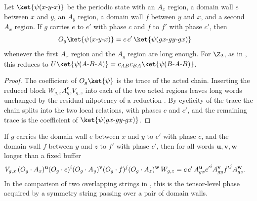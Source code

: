 \begin{lemma}
    \label{thm:mpug_domain_wall_state}
    \leanok
    Let $\ket{\psi(x\text{-}y\text{-}x)}$ be the periodic state with an $A_x$
    region, a domain wall $e$ between $x$ and $y$, an $A_y$ region, a domain
    wall $f$ between $y$ and $x$, and a second $A_x$ region. If $g$ carries
    $e$ to $e'$ with phase $c$ and $f$ to $f'$ with phase $c'$, then
    \begin{align}
        O_g\ket{\psi(x\text{-}y\text{-}x)}
         & =c\,c'\,\ket{\psi(gx\text{-}gy\text{-}gx)}
        \notag
    \end{align}
    whenever the first $A_x$ region and the $A_y$ region are long enough.
    For $\Z_2$, as in \cite[Section~III.B]{GarreRubioSchuch2024DomainWall},
    this reduces to $U\ket{\psi(A\text{-}B\text{-}A)}
        =c_{AB}c_{BA}\ket{\psi(B\text{-}A\text{-}B)}$.
\end{lemma}

\begin{proof}\leanok
    The coefficient of $O_g\ket{\psi}$ is the trace of the acted chain.
    Inserting the reduced block $W_{g,z}A_{gz}^{\mathbf c}V_{g,z}$ into each
    of the two acted regions leaves long words unchanged by the residual
    nilpotency of a reduction \cite{Molnar2018SemiInjective}. By cyclicity
    of the trace the chain splits into the two local relations, with phases
    $c$ and $c'$, and the remaining trace is the coefficient of
    $\ket{\psi(gx\text{-}gy\text{-}gx)}$.
\end{proof}

\begin{lemma}
    \label{thm:mpug_domain_wall_pair}
    \leanok
    If $g$ carries the domain wall $e$ between $x$ and $y$ to $e'$ with phase
    $c$, and the domain wall $f$ between $y$ and $z$ to $f'$ with phase $c'$,
    then for all words $\mathbf u,\mathbf v,\mathbf w$ longer than a fixed
    buffer
    \begin{align}
        V_{g,x}\,(O_g\cdot A_x)^{\mathbf u}(O_g\cdot e)^i
        (O_g\cdot A_y)^{\mathbf v}(O_g\cdot f)^j(O_g\cdot A_z)^{\mathbf w}\,
        W_{g,z}
         & =c\,c'\,A_{gx}^{\mathbf u}{e'}^{i}A_{gy}^{\mathbf v}{f'}^{j}
        A_{gz}^{\mathbf w}.
        \notag
    \end{align}
    In the comparison of two overlapping strings in
    \cite[Section~III.F]{GarreRubioSchuch2024DomainWall}, this is the
    tensor-level phase acquired by a symmetry string passing over a pair of
    domain walls.
\end{lemma}

